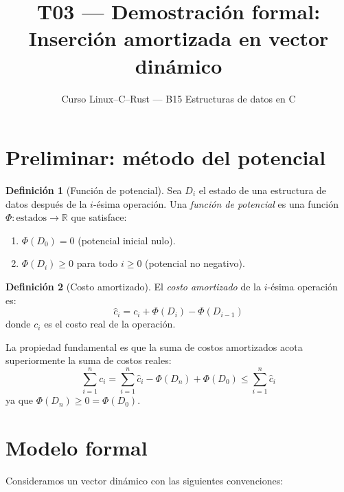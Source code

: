 \documentclass[11pt, letterpaper]{article}
\title{%
  T03 --- Demostración formal:\\[4pt]
  Inserción amortizada en vector dinámico
}
\author{Curso Linux--C--Rust --- B15 Estructuras de datos en C}
\date{}
\theoremstyle{definition}
\newtheorem{definition}{Definición}[section]
\theoremstyle{plain}
\theoremstyle{remark}
\begin{document}
\maketitle
\tableofcontents

\section{Preliminar: método del potencial}

\begin{definition}[Función de potencial]
Sea $D_i$ el estado de una estructura de datos después de la $i$-ésima
operación. Una \emph{función de potencial} es una función
$\Phi : \text{estados} \to \mathbb{R}$ que satisface:
\begin{enumerate}
  \item $\Phi(D_0) = 0$ \quad (potencial inicial nulo).
  \item $\Phi(D_i) \geq 0$ para todo $i \geq 0$ \quad (potencial no negativo).
\end{enumerate}
\end{definition}

\begin{definition}[Costo amortizado]
El \emph{costo amortizado} de la $i$-ésima operación es:
\begin{equation}\label{eq:amortized}
  \hat{c}_i = c_i + \Phi(D_i) - \Phi(D_{i-1})
\end{equation}
donde $c_i$ es el costo real de la operación.
\end{definition}

La propiedad fundamental es que la suma de costos amortizados acota
superiormente la suma de costos reales:
\begin{equation}\label{eq:fundamental}
  \sum_{i=1}^{n} c_i
  = \sum_{i=1}^{n} \hat{c}_i - \Phi(D_n) + \Phi(D_0)
  \leq \sum_{i=1}^{n} \hat{c}_i
\end{equation}
ya que $\Phi(D_n) \geq 0 = \Phi(D_0)$.

\section{Modelo formal}

Consideramos un vector dinámico con las siguientes convenciones:
\end{document}
